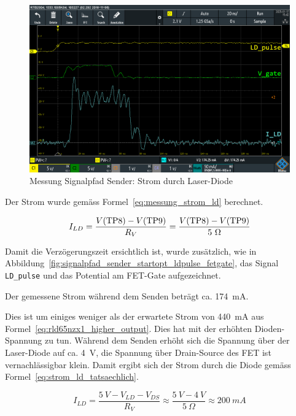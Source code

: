 \begin{figure}[H]
    \centering
    \includegraphics[width=\textwidth]{graphics/signalpfad_sender_ld_strom}
    \caption{Messung Signalpfad Sender: Strom durch Laser-Diode}\label{fig:signalpfad_sender_ld_strom}
\end{figure}

Der Strom wurde gemäss Formel~\ref{eq:messung_strom_ld} berechnet.

\begin{equation}\label{eq:messung_strom_ld}
    I_{LD} = \frac{V(\text{\lstinline|TP8|}) - V(\text{\lstinline|TP9|})}{R_V} = \frac{V(\text{\lstinline|TP8|}) - V(\text{\lstinline|TP9|})}{5~\Omega}
\end{equation}

Damit die Verzögerungszeit ersichtlich ist, wurde zusätzlich, wie in Abbildung~\ref{fig:signalpfad_sender_startopt_ldpulse_fetgate},
das Signal \lstinline|LD_pulse| und das Potential am FET-Gate aufgezeichnet.

Der gemessene Strom während dem Senden beträgt ca. 174~mA.

Dies ist um einiges weniger als der erwartete Strom von 440~mA aus Formel~\ref{eq:rld65nzx1_higher_output}. Dies hat mit
der erhöhten Dioden-Spannung zu tun. Während dem Senden erhöht sich die Spannung über der Laser-Diode auf ca. 4~V, die
Spannung über Drain-Source des FET ist vernachlässigbar klein. Damit ergibt sich der Strom durch die Diode gemäss
Formel~\ref{eq:strom_ld_tatsaechlich}.

\begin{equation}\label{eq:strom_ld_tatsaechlich}
    I_{LD} = \frac{5~V - V_{LD} - V_{DS}}{R_V} \approx \frac{5~V - 4~V}{5~\Omega} \approx 200~mA
\end{equation}

